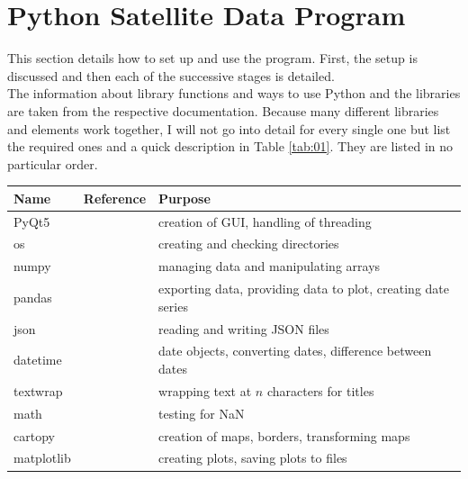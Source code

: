 \documentclass[../00_main.tex]{subfiles}
\begin{document}
\section{Python Satellite Data Program}

This section details how to set up and use the program. First, the setup is 
discussed and then each of the successive stages is detailed.\\

The information about library functions and ways to use Python and the 
libraries are taken from the respective documentation. Because many different
libraries and elements work together, I will not go into detail for every 
single one but list the required ones and a quick description in Table
\ref{tab:01}. They are listed in no particular order.
\begin{table}[H]
    \center
\begin{tabular}{| l | l | l |}\hline
    Name        & Reference         & Purpose       \\\hline\hline
    PyQt5       & \cite{pyqt}       & creation of GUI, handling of threading
                                        \\\hline
    os          & \cite{py-os}      & creating and checking directories
                                        \\\hline
    numpy       & \cite{py-numpy}   & managing data and manipulating arrays
                                        \\\hline
    pandas      & \cite{pandas}     & exporting data, providing data to plot, 
                                        creating date series\\\hline
    json        & \cite{py-json}    & reading and writing JSON files
                                        \\\hline
    datetime    & \cite{py-datetime}& date objects, converting dates, 
                                        difference between dates\\\hline
    textwrap    & \cite{py-textwrap}& wrapping text at $n$ characters for 
                                        titles\\\hline
    math        & \cite{py-math}    & testing for NaN
                                        \\\hline
    cartopy     & \cite{py-cartopy} & creation of maps, borders, transforming 
                                        maps\\\hline
    matplotlib  & \cite{py-mpl}     & creating plots, saving plots to files

\end{tabular}
\end{table}
\end{document}
